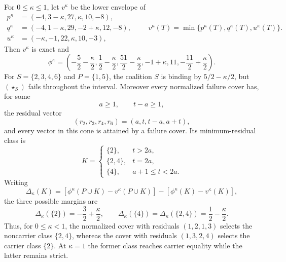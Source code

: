 \begin{proposition}
\label{prop:lx-cover-selection}
For $0\leq\kappa\leq1$, let $v^\kappa$ be the lower envelope of
\[
\begin{aligned}
 p^\kappa&=(-4,3-\kappa,27,\kappa,10,-8),\\
 q^\kappa&=(-4,1-\kappa,29,-2+\kappa,12,-8),\\
 u^\kappa&=(-\kappa,-1,22,\kappa,10,-3),
\end{aligned}
\qquad
v^\kappa(T)=\min\{p^\kappa(T),q^\kappa(T),u^\kappa(T)\}.
\]
Then $v^\kappa$ is exact and
\[
 \phi^\kappa=\left(-\frac52-\frac\kappa2,
 \frac12-\frac\kappa2,\frac{51}2-\frac\kappa2,-1+\kappa,
 11,-\frac{11}2+\frac\kappa2\right).
\]
For $S=\{2,3,4,6\}$ and $P=\{1,5\}$, the coalition $S$ is binding by
$5/2-\kappa/2$, but $(\star_S)$ fails throughout the interval.  Moreover
every normalized failure cover has, for some
\[
 a\geq1,\qquad t-a\geq1,
\]
the residual vector
\[
 (r_2,r_3,r_4,r_6)=(a,t,t-a,a+t),                       \tag{RC}
 \label{eq:lx-cover-selection-cone}
\]
and every vector in this cone is attained by a failure cover.  Its
minimum-residual class is
\[
 K=\begin{cases}
 \{2\},&t>2a,\\
 \{2,4\},&t=2a,\\
 \{4\},&a+1\leq t<2a.
 \end{cases}
\]
Writing
\[
 \Delta_\kappa(K)
 =[\phi^\kappa(P\cup K)-v^\kappa(P\cup K)]
  -[\phi^\kappa(K)-v^\kappa(K)],
\]
the three possible margins are
\[
 \Delta_\kappa(\{2\})=-\frac32+\frac\kappa2,
 \qquad
 \Delta_\kappa(\{4\})=\Delta_\kappa(\{2,4\})
 =\frac12-\frac\kappa2.
\]
Thus, for $0\leq\kappa<1$, the normalized cover with residuals
$(1,2,1,3)$ selects the noncarrier class $\{2,4\}$, whereas the cover with
residuals $(1,3,2,4)$ selects the carrier class $\{2\}$.  At $\kappa=1$
the former class reaches carrier equality while the latter remains strict.
\end{proposition}

